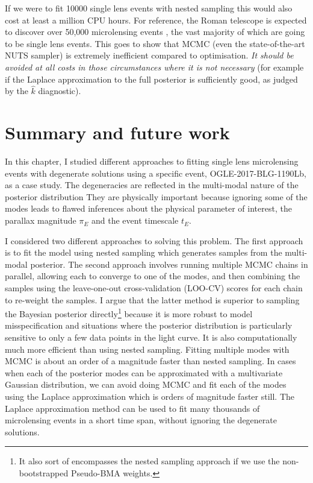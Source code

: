 \documentclass[12pt,dvipsnames]{report}
\begin{document}
If we were to fit 10000 single lens events with nested sampling this would also cost 
at least a million CPU hours. For reference, the Roman telescope is expected to 
discover over 50,000 microlensing events \citep{2020AJ....160..123J}, the vast majority 
of which are going to be single lens events.
This goes to show that MCMC (even the state-of-the-art
NUTS sampler) is extremely inefficient compared to optimisation.
\emph{It should be avoided 
at all costs in those circumstances where it is not necessary} (for example if 
the Laplace approximation to the full posterior is sufficiently good, as judged by the 
$\hat k$ diagnostic).

\section{Summary and future work}
\label{sec:conclusions_single_lens}
In this chapter, I studied different approaches to fitting single lens microlensing 
events with degenerate solutions using a specific event, OGLE-2017-BLG-1190Lb, as a case study.  
The degeneracies are reflected in the multi-modal nature of the posterior distribution
They are physically important
because ignoring some of the modes leads to flawed inferences about the physical parameter 
of interest, the parallax magnitude $\pi_E$ and the event timescale $t_E$.

I considered two  different approaches to solving this problem. The first approach is to fit 
the model using nested sampling which generates samples from the multi-modal posterior.
The second approach involves running multiple MCMC chains in parallel, allowing each to converge 
to one of the modes, and then combining the samples using the leave-one-out cross-validation 
(LOO-CV) scores for each chain to re-weight the samples. 
I argue that the latter method is superior to sampling the Bayesian posterior directly\footnote{
    It also sort of encompasses the nested sampling approach if we use the 
    non-bootstrapped Pseudo-BMA weights.
} because it is more robust to model misspecification and situations where the posterior 
distribution is particularly sensitive to only a few data points in the light curve.
It is also computationally much more efficient than using nested sampling.
Fitting multiple modes with MCMC is about an order of a magnitude faster 
than nested sampling. In cases when each of the posterior modes can be approximated 
with a multivariate Gaussian distribution, we can avoid doing MCMC and fit each of the modes
using the Laplace approximation which is orders of magnitude faster still.
The Laplace approximation method can be used to fit many thousands of 
microlensing events in a short time span, without ignoring the degenerate solutions. 
\end{document}
